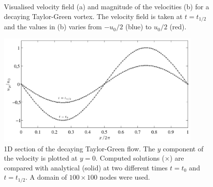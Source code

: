 \begin{figure}
  \centering
  \hspace{5pt} 
  \caption{Visualised velocity field (a) and magnitude of the
    velocities (b) for a decaying Taylor-Green vortex. The velocity
    field is taken at $t=t_{1/2}$ and the values in (b) varies from
    $-u_0/2$ (blue) to $u_0/2$ (red).}
  \label{fig:mb:taylor_vis}
\end{figure}

\begin{figure}
\begin{center}
\includegraphics[width=0.9\textwidth]{fig/taylor_uy.pdf}
\end{center}
\caption{1D section of the decaying Taylor-Green flow. The $y$
  component of the velocity is plotted at $y = 0$. Computed solutions
  ($\times$) are compared with analytical (solid) at two different
  times $t = t_0$ and $t = t_{1/2}$. A domain of $100\times100$ nodes
  were used.}
\label{fig:mb:tg_uy}
\end{figure}

